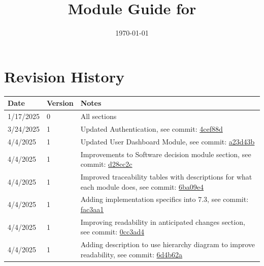 \documentclass[12pt, titlepage]{article}
\begin{document}
\title{Module Guide for \progname{}} 
\author{\authname}
\date{\today}

\maketitle


\section{Revision History}

\begin{tabularx}{\textwidth}{p{3cm}p{2cm}X}
\toprule {\bf Date} & {\bf Version} & {\bf Notes}\\
\midrule
1/17/2025 & 0 & All sections\\
3/24/2025 & 1 & Updated Authentication, see commit: \href{https://github.com/ausbennett/mes-finance-platform/commit/4cef88de4d7c2a664fa8e2395804251c0a6baeb4}{4cef88d}\\
4/4/2025 & 1 & Updated User Dashboard Module, see commit: \href{https://github.com/ausbennett/mes-finance-platform/commit/a23d43b84b1426d0f6a8d13d3120043a0d8c54b3}{a23d43b}\\
4/4/2025 & 1 & Improvements to Software decision module section, see commit: \href{https://github.com/ausbennett/mes-finance-platform/commit/d28cc2c30433566afcd2b0621950a5832a6cc40e}{d28cc2c}\\
4/4/2025 & 1 & Improved traceability tables with descriptions for what each module does, see commit: \href{https://github.com/ausbennett/mes-finance-platform/commit/6ba09e4a79e3f6a3cf5ef14b3514668898f55438}{6ba09e4}\\
4/4/2025 & 1 & Adding implementation specifics into 7.3, see commit: \href{https://github.com/ausbennett/mes-finance-platform/commit/fac3aa1adfd32881adc95c603df28100f891b46a}{fac3aa1}\\
4/4/2025 & 1 & Improving readability in anticipated changes section, see commit: \href{https://github.com/ausbennett/mes-finance-platform/commit/0cc3ad45ad4c4781cc4ed82fac16693b40476860}{0cc3ad4}\\
4/4/2025 & 1 & Adding description to use hierarchy diagram to improve readability, see commit: \href{https://github.com/ausbennett/mes-finance-platform/commit/6d4b62aad45c5ffa42d97915b147907c9c27d511}{6d4b62a}\\
\bottomrule
\end{tabularx}
\end{document}

